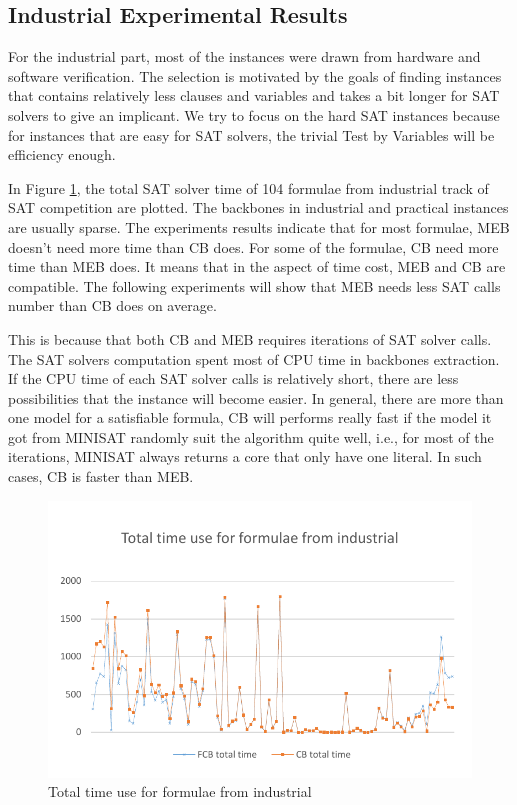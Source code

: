 \subsection{Industrial Experimental Results}

For the industrial part, most of the instances were drawn from hardware and software verification. The selection is motivated by the goals of finding instances that contains relatively less clauses and variables and takes a bit longer for SAT solvers to give an implicant. We try to focus on the hard SAT instances because for instances that are easy for SAT solvers, the trivial Test by Variables will be efficiency enough.

In Figure \ref{fig:ind-time}, the total SAT solver time of 104 formulae from industrial track of SAT competition are plotted. The backbones in industrial and practical instances are usually sparse. The experiments results indicate that for most formulae, MEB doesn't need more time than CB does. For some of the formulae, CB need more time than MEB does. It means that in the aspect of time cost, MEB and CB are compatible. The following experiments will show that MEB needs less SAT calls number than CB does on average.

This is because that both CB and MEB requires iterations of SAT solver calls. The SAT solvers computation spent most of CPU time in backbones extraction. If the CPU time of each SAT solver calls is relatively short, there are less possibilities that the instance will become easier. In general, there are more than one model for a satisfiable formula, CB will performs really fast if the model it got from MINISAT randomly suit the algorithm quite well, i.e., for most of the iterations, MINISAT always returns a core that only have one literal. In such cases, CB is faster than MEB.

\begin{figure}
    \centering
    \includegraphics[scale=0.7]{ind.pdf}
   \caption{Total time use for formulae from industrial}
   \label{fig:ind-time}
\end{figure}

